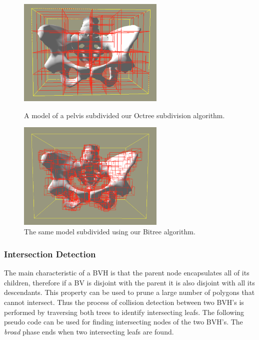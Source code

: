     \begin{figure}
    \begin{minipage}[t]{7cm}
    \begin{center}
    \includegraphics[width=70mm]{sections/methodology/images/contact/bvh-octree.png}
    \caption[A model of a pelvis with its BVH created using our Octree subdivision algorithm.]{\label{contact-octree} A model of a pelvis subdivided our Octree subdivision algorithm.}
    \end{center}
    \end{minipage}
    \hfill
    \begin{minipage}[t]{7cm}
    \begin{center}
    \includegraphics[width=70mm]{sections/methodology/images/contact/bvh-bitree.png}
    \caption[The same model subdivided using our Bitree algorithm.]{\label{contact-bitree} The same model subdivided using our Bitree algorithm.}
    \end{center}
    \end{minipage}
    \end{figure}

    \subsubsection{Intersection Detection}
    The main characteristic of a BVH is that the parent node encapsulates all of its children, therefore if a BV is disjoint with the parent it is also disjoint with all its descendants. This property can be used to prune a large number of polygons that cannot intersect. Thus the process of collision detection between two BVH's is performed by traversing both trees to identify intersecting leafs. The following pseudo code can be used for finding intersecting nodes of the two BVH's. The \emph{broad} phase ends when two intersecting leafs are found.


